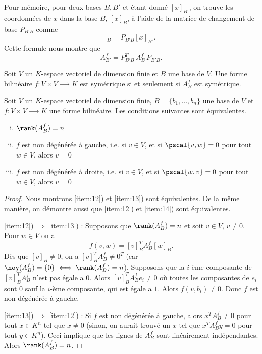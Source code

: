 Pour mémoire, pour deux bases $B,B'$ et étant donné $[x]_{B'}$,  on trouve les coordonnées de $x$ dans la base $B$,  $[x]_B$,  à l'aide de la matrice de changement de base $P_{B'B}$ comme 
\begin{displaymath}
  [x]_B = P_{B'B} [x]_{B'}. 
\end{displaymath}
Cette formule nous montre que 
\begin{equation}
\label{eq:28}
 A_{B'}^f =  P_{B'B}^T \,A_B^f \,  P_{B'B}. 
\end{equation}

\begin{exercise}
  Soit $V$ un $K$-espace vectoriel de dimension finie et $B$ une base de $V$. 
  Une forme bilinéaire $f : V ×V ⟶ K$ 
  est symétrique si et seulement si $A_B^f$ est symétrique.
\end{exercise}

\begin{proposition}
  \label{prop:7}
  Soit $V$ un $K$-espace vectoriel de dimension finie, $B= \{b_1, \dots , b_n\}$ une base de $V$ et $f : V × V ⟶K$ une forme bilinéaire.   Les conditions suivantes sont équivalentes. 
  \begin{enumerate}[i)]
  \item $\rank(A_B^f) = n$ \label{item:12}
  \item $f$ est non dégénérée à gauche, i.e. si $v \in V$, et si $\pscal{v,w}=0$ pour tout $w \in V$, alors $v = 0$ \label{item:13}
  \item $f$ est non dégénérée à droite, i.e. si $v \in V$, et si $\pscal{w, v}=0$ pour tout $w \in V$, alors $v = 0$ \label{item:14}
  \end{enumerate}
\end{proposition}

\begin{proof} 

Nous montrons \ref{item:12}) et \ref{item:13}) sont équivalentes.  De la même manière, on démontre aussi que \ref{item:12}) et \ref{item:14}) sont équivalentes.

\ref{item:12}) $\Rightarrow$ \ref{item:13}) : Supposons que $\rank(A_B^f) = n$ et soit $v \in V$, $v \neq 0$. Pour $w \in V$ on a 
\begin{displaymath}
  f(v,w) = [v]_B^T A_B^f [w]_B. 
\end{displaymath}
Dès que $[v]_B \neq 0$, on a $[v]_B^T A_B^f \neq 0^T$ (car $\noy(A_B^f) = \{0\} \iff \rank(A_B^f) = n$). Supposons que la $i$-ème composante de $[v]_B^T A_B^f$ n'est pas égale a $0$. Alors $[v]_B^T A_B^f e_i \neq 0$ où toutes les composantes de $e_i$ sont $0$ sauf la $i$-ème composante, 
qui est égale a $1$. Alors $f(v,b_i) \neq 0$. Donc $f$ est non dégénérée à gauche. \newline

\ref{item:13}) $\Rightarrow$ \ref{item:12}) : Si $f$ est non dégénérée à gauche, alors $x^T A_B^f \neq 0$ pour tout $x \in K^n$ tel que $x \neq 0$ (sinon, on aurait trouvé un $x$ tel que $x^T A_B^f y = 0$ pour tout $y \in K^n$). Ceci implique que les lignes de $A_B^f$ sont linéairement indépendantes. Alors $\rank(A_B^f) = n$. 
\end{proof}






